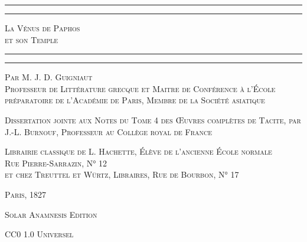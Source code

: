 \documentclass[a4paper, 11pt, oneside, polutonikogreek, french]{article}
\begin{document}
\begin{titlepage} %
	\centering %

	
	\rule{\textwidth}{1.6pt}\vspace*{-\baselineskip}\vspace*{2pt} %
	\rule{\textwidth}{0.4pt} %
	
	{\scshape\LARGE La Vénus de Paphos \\ et son Temple}
	
	\rule{\textwidth}{0.4pt}\vspace*{-\baselineskip}\vspace{3.2pt} %
	\rule{\textwidth}{1.6pt} %

	
	\vspace{1\baselineskip}
	
	{\scshape Par \large M. J. D. Guigniaut \\\footnotesize Professeur de Littérature grecque et Maitre de Conférence à l'École préparatoire de l'Académie de Paris, Membre de la Société asiatique} %

        \vspace{1\baselineskip}

        {\scshape\scriptsize Dissertation jointe aux Notes du Tome 4 des Œuvres complètes de Tacite, par J.-L. Burnouf, Professeur au Collège royal de France}
	
	
    \vspace*{\fill}

	\vspace{1\baselineskip}

	{\footnotesize\scshape Librairie classique de L. Hachette, Élève de l'ancienne École normale \\ Rue Pierre-Sarrazin, N° 12 \\ et chez Treuttel et Würtz, Libraires, Rue de Bourbon, N° 17}
	
	{\scshape{Paris, 1827}}
	
	\vspace{0.5\baselineskip} %

    \scshape Solar Anamnesis Edition  %
	
	{\scshape\small CC0 1.0 Universel} %
\end{titlepage}
\end{document}
